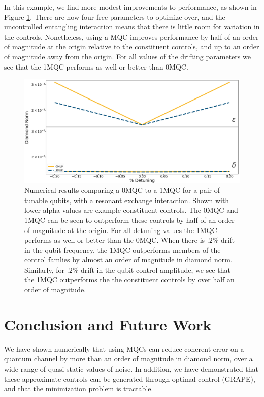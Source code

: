 \documentclass[aps,nofootinbib,pra,notitlepage,twocolumn]{revtex4-1}
\begin{document}
In this example, we find more modest improvements to performance, as shown in Figure \ref{fig:2MQC}. There are now four free parameters to optimize over, and the uncontrolled entangling interaction means that there is little room for variation in the controls. Nonetheless, using a MQC improves performance by half of an order of magnitude at the origin relative to the constituent controls, and up to an order of magnitude away from the origin. For all values of the drifting parameters we see that the 1MQC performs as well or better than 0MQC.

\begin{figure}
  \centering
  \includegraphics[width=\columnwidth]{2QRBC_no_member.png}
  \caption{Numerical results comparing a 0MQC to a 1MQC for a pair of tunable qubits, with a resonant exchange interaction. Shown with lower alpha values are example constituent controls. The 0MQC and 1MQC can be seen to outperform these controls by half of an order of magnitude at the origin. For all detuning values the 1MQC performs as well or better than the 0MQC. When there is $.2\%$ drift in the qubit frequency, the 1MQC outperforms members of the control famlies by almost an order of magnitude in diamond norm. Similarly, for $.2\%$ drift in the qubit control amplitude, we see that the 1MQC outperforms the the constituent controls by over half an order of magnitude.}
  \label{fig:2MQC}
\end{figure}








\section{Conclusion and Future Work}
We have shown numerically that using MQCs can reduce coherent error on a quantum channel by more than an order of magnitude in diamond norm, over a wide range of quasi-static values of noise. In addition, we have demonstrated that these approximate controls can be generated through optimal control (GRAPE), and that the minimization problem is tractable.
\end{document}
